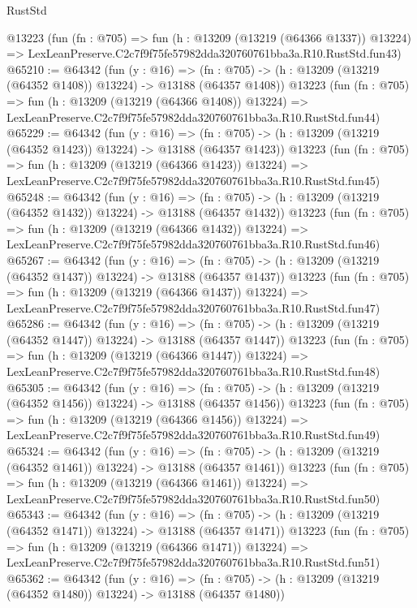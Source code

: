 \begin{lexlean}{RustStd}
\begin{coremodule}
    @13223
    (fun (fn : @705) =>
    fun (h : @13209 (@13219 (@64366 @1337)) @13224) =>
    LexLeanPreserve.C2c7f9f75fe57982dda320760761bba3a.R10.RustStd.fun43)
@65210 := @64342
    (fun (y : @16) =>
    (fn : @705) -> (h : @13209 (@13219 (@64352 @1408)) @13224) -> @13188 (@64357 @1408))
    @13223
    (fun (fn : @705) =>
    fun (h : @13209 (@13219 (@64366 @1408)) @13224) =>
    LexLeanPreserve.C2c7f9f75fe57982dda320760761bba3a.R10.RustStd.fun44)
@65229 := @64342
    (fun (y : @16) =>
    (fn : @705) -> (h : @13209 (@13219 (@64352 @1423)) @13224) -> @13188 (@64357 @1423))
    @13223
    (fun (fn : @705) =>
    fun (h : @13209 (@13219 (@64366 @1423)) @13224) =>
    LexLeanPreserve.C2c7f9f75fe57982dda320760761bba3a.R10.RustStd.fun45)
@65248 := @64342
    (fun (y : @16) =>
    (fn : @705) -> (h : @13209 (@13219 (@64352 @1432)) @13224) -> @13188 (@64357 @1432))
    @13223
    (fun (fn : @705) =>
    fun (h : @13209 (@13219 (@64366 @1432)) @13224) =>
    LexLeanPreserve.C2c7f9f75fe57982dda320760761bba3a.R10.RustStd.fun46)
@65267 := @64342
    (fun (y : @16) =>
    (fn : @705) -> (h : @13209 (@13219 (@64352 @1437)) @13224) -> @13188 (@64357 @1437))
    @13223
    (fun (fn : @705) =>
    fun (h : @13209 (@13219 (@64366 @1437)) @13224) =>
    LexLeanPreserve.C2c7f9f75fe57982dda320760761bba3a.R10.RustStd.fun47)
@65286 := @64342
    (fun (y : @16) =>
    (fn : @705) -> (h : @13209 (@13219 (@64352 @1447)) @13224) -> @13188 (@64357 @1447))
    @13223
    (fun (fn : @705) =>
    fun (h : @13209 (@13219 (@64366 @1447)) @13224) =>
    LexLeanPreserve.C2c7f9f75fe57982dda320760761bba3a.R10.RustStd.fun48)
@65305 := @64342
    (fun (y : @16) =>
    (fn : @705) -> (h : @13209 (@13219 (@64352 @1456)) @13224) -> @13188 (@64357 @1456))
    @13223
    (fun (fn : @705) =>
    fun (h : @13209 (@13219 (@64366 @1456)) @13224) =>
    LexLeanPreserve.C2c7f9f75fe57982dda320760761bba3a.R10.RustStd.fun49)
@65324 := @64342
    (fun (y : @16) =>
    (fn : @705) -> (h : @13209 (@13219 (@64352 @1461)) @13224) -> @13188 (@64357 @1461))
    @13223
    (fun (fn : @705) =>
    fun (h : @13209 (@13219 (@64366 @1461)) @13224) =>
    LexLeanPreserve.C2c7f9f75fe57982dda320760761bba3a.R10.RustStd.fun50)
@65343 := @64342
    (fun (y : @16) =>
    (fn : @705) -> (h : @13209 (@13219 (@64352 @1471)) @13224) -> @13188 (@64357 @1471))
    @13223
    (fun (fn : @705) =>
    fun (h : @13209 (@13219 (@64366 @1471)) @13224) =>
    LexLeanPreserve.C2c7f9f75fe57982dda320760761bba3a.R10.RustStd.fun51)
@65362 := @64342
    (fun (y : @16) =>
    (fn : @705) -> (h : @13209 (@13219 (@64352 @1480)) @13224) -> @13188 (@64357 @1480))

\end{coremodule}
\end{lexlean}

